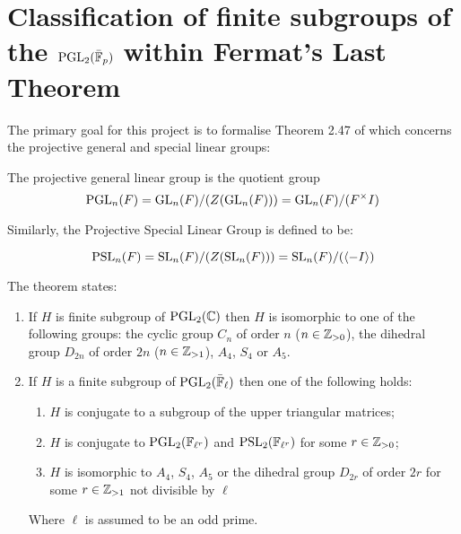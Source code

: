\section{Classification of finite subgroups of the $\operatorname{PGL}_2(\bar{\mathbb{F}}_p)$ within Fermat's Last Theorem}

The primary goal for this project is to formalise Theorem 2.47 of \cite{dtt} which 
concerns the projective general and special linear groups:

\begin{definition}
    The projective general linear group is the quotient group
    \[    
    \operatorname{PGL}_n(F) = \operatorname{GL}_n(F) / (Z(\operatorname{GL}_n(F))) = \operatorname{GL}_n(F) / (F^\times I) 
    \]
\end{definition}

Similarly, the Projective Special Linear Group is defined to be:

\begin{definition}
    \[
    \operatorname{PSL}_n(F) = \operatorname{SL}_n(F) / (Z(\operatorname{SL}_n(F))) = \operatorname{SL}_n(F) / (\langle -I\rangle)
    \]
\end{definition}

The theorem states:

\begin{enumerate}
    \item If $H$ is finite subgroup of $\operatorname{PGL}_2(\mathbb{C})$ then $H$ is isomorphic to one of the following groups: the cyclic group $C_n$ of order $n$ ($n \in \mathbb{Z}_{>0}$), the dihedral group $D_{2n}$ of order $2n$ ($n \in \mathbb{Z}_{>1}$), $A_4$, $S_4$ or $A_5$.
\item If $H$ is a finite subgroup of $\operatorname{PGL}_2(\bar{\mathbb{F}}_\ell)$ then one of the following holds:
\begin{enumerate}
    \item $H$ is conjugate to a subgroup of the upper triangular matrices;
    \item $H$ is conjugate to $\operatorname{PGL}_2(\mathbb{F}_{\ell^r})$ and $\operatorname{PSL}_2(\mathbb{F}_{\ell^{r}})$ for some $r \in \mathbb{Z}_{>0}$;
    \item $H$ is isomorphic to $A_4$, $S_4$, $A_5$ or the dihedral group $D_{2r}$ of order $2r$ for some $r \in \mathbb{Z}_{>1}$ not divisible by $\ell$

\end{enumerate}
    Where $\ell$ is assumed to be an odd prime.
\end{enumerate}




